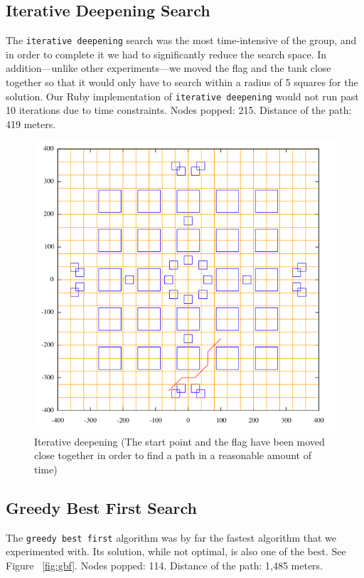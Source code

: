 \subsection{Iterative Deepening Search}
The \texttt{iterative deepening} search was the most time-intensive of the group, and in order to complete it we had to significantly reduce the search space.  In addition---unlike other experiments---we moved the flag and the tank close together so that it would only have to search within a radius of 5 squares for the solution.  Our Ruby implementation of \texttt{iterative deepening} would not run past 10 iterations due to time constraints.  Nodes popped: 215.  Distance of the path: 419 meters.

\begin{figure}
\begin{center}\centering
\includegraphics[width=\textwidth]{id1.png}
\caption{Iterative deepening (The start point and the flag have been moved close together in order to find a path in a reasonable amount of time)}
\end{center}
\end{figure}

\subsection{Greedy Best First Search}
The \texttt{greedy best first} algorithm was by far the fastest algorithm that we experimented with.  Its solution, while not optimal, is also one of the best.  See Figure ~\ref{fig:gbf}.  Nodes popped: 114.  Distance of the path: 1,485 meters.

